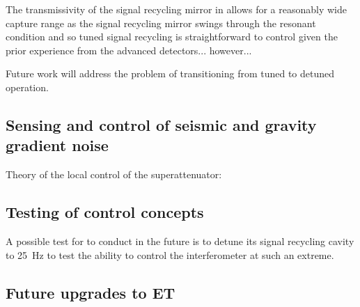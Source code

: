 The transmissivity of the signal recycling mirror in \ETLF{} allows for a reasonably wide capture range as the signal recycling mirror swings through the resonant condition and so tuned signal recycling is straightforward to control given the prior experience from the advanced detectors... however...

Future work will address the problem of transitioning \ETLF{} from tuned to detuned operation.

\subsection{Sensing and control of seismic and gravity gradient noise}

Theory of the local control of the superattenuator: \cite{Acernese2004}

\subsection{Testing of control concepts}
A possible test for \GEOHF{} to conduct in the future is to detune its signal recycling cavity to \SI{25}{\hertz} to test the ability to control the interferometer at such an extreme.

\subsection{Future upgrades to ET}
